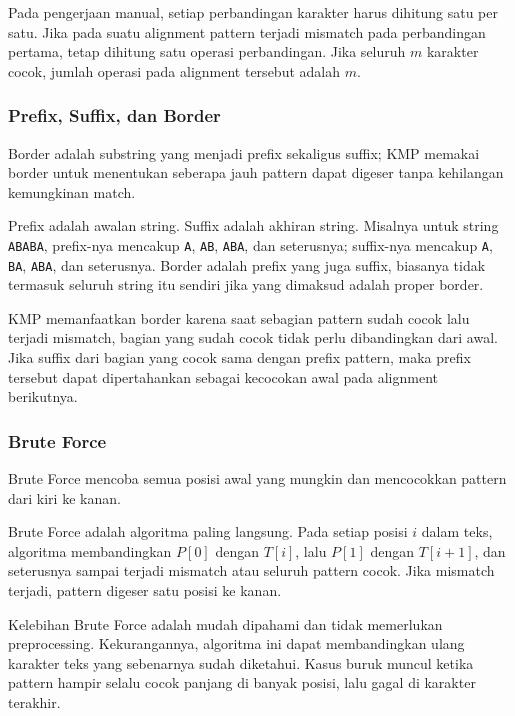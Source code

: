 Pada pengerjaan manual, setiap perbandingan karakter harus dihitung satu per satu. Jika pada suatu alignment pattern terjadi mismatch pada perbandingan pertama, tetap dihitung satu operasi perbandingan. Jika seluruh $m$ karakter cocok, jumlah operasi pada alignment tersebut adalah $m$.

\subsubsection{Prefix, Suffix, dan Border}

\begin{jawab}
Border adalah substring yang menjadi prefix sekaligus suffix; KMP memakai border untuk menentukan seberapa jauh pattern dapat digeser tanpa kehilangan kemungkinan match.
\end{jawab}

Prefix adalah awalan string. Suffix adalah akhiran string. Misalnya untuk string \texttt{ABABA}, prefix-nya mencakup \texttt{A}, \texttt{AB}, \texttt{ABA}, dan seterusnya; suffix-nya mencakup \texttt{A}, \texttt{BA}, \texttt{ABA}, dan seterusnya. Border adalah prefix yang juga suffix, biasanya tidak termasuk seluruh string itu sendiri jika yang dimaksud adalah proper border.

KMP memanfaatkan border karena saat sebagian pattern sudah cocok lalu terjadi mismatch, bagian yang sudah cocok tidak perlu dibandingkan dari awal. Jika suffix dari bagian yang cocok sama dengan prefix pattern, maka prefix tersebut dapat dipertahankan sebagai kecocokan awal pada alignment berikutnya.

\subsubsection{Brute Force}

\begin{jawab}
Brute Force mencoba semua posisi awal yang mungkin dan mencocokkan pattern dari kiri ke kanan.
\end{jawab}

Brute Force adalah algoritma paling langsung. Pada setiap posisi $i$ dalam teks, algoritma membandingkan $P[0]$ dengan $T[i]$, lalu $P[1]$ dengan $T[i+1]$, dan seterusnya sampai terjadi mismatch atau seluruh pattern cocok. Jika mismatch terjadi, pattern digeser satu posisi ke kanan.

Kelebihan Brute Force adalah mudah dipahami dan tidak memerlukan preprocessing. Kekurangannya, algoritma ini dapat membandingkan ulang karakter teks yang sebenarnya sudah diketahui. Kasus buruk muncul ketika pattern hampir selalu cocok panjang di banyak posisi, lalu gagal di karakter terakhir.

